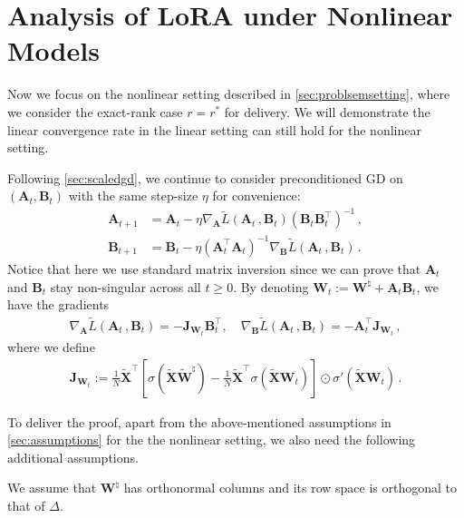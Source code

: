 \section{Analysis of LoRA under Nonlinear Models}
\label{sec:nonlinear}


Now we focus on the nonlinear setting described in \cref{sec:problsemsetting}, where we consider the exact-rank case $r=r^*$ for delivery.
We will demonstrate the linear convergence rate in the linear setting can still hold for the nonlinear setting.

Following \cref{sec:scaledgd}, we continue to consider preconditioned GD on $(\bm A_t, \bm B_t)$ with the same step-size $\eta$ for convenience:
\begin{equation}\label{eq:ABiter_nonlinear}
\begin{split}
     \bm A_{t+1} & = \bm A_t - \eta \nabla_{\bm A} \widetilde{L}\left(\bm A_t\,,\bm B_t\right)\left(\bm B_t \bm B_t^{\!\top}\right)^{-1}\,, \\
     \bm B_{t+1}  & = \bm B_t - \eta \left(\bm A_t^{\!\top} \bm A_t\right)^{-1} \nabla_{\bm B} \widetilde{L}\left(\bm A_t\,,\bm B_t\right)\,.
\end{split}
\end{equation}
Notice that here we use standard matrix inversion since we can prove that $\bm A_t$ and $\bm B_t$ stay non-singular across all $t\geq 0$.
By denoting $\bm W_t := \bm W^{\natural} + \bm A_t \bm B_t$, we have the gradients
\begin{align*}
\nabla_{\bm A}\widetilde{L}\left(\bm A_t\,,\bm B_t\right) = -\bm J_{
\bm W_t} \bm B_t^{\!\top}, \quad 
\nabla_{\bm B}\widetilde{L}\left(\bm A_t\,,\bm B_t\right) = -\bm A_t^{\!\top} \bm J_{
\bm W_t} \,,
\end{align*}
where we define 
\begin{align*}
    \bm J_{
\bm W_t} := \frac{1}{N}\widetilde{\bm X}^{\!\top}\left[\sigma(\widetilde{\bm X}\widetilde{\bm W}^\natural) - \frac{1}{N}\widetilde{\bm X}^{\!\top}\sigma(\widetilde{\bm X}\bm W_t)\right]\odot \sigma'(\widetilde{\bm X}\bm W_t)\,.
\end{align*}

To deliver the proof, apart from the above-mentioned assumptions in \cref{sec:assumptions} for the the nonlinear setting, we also need the following additional assumptions.
\begin{assumption}\label{assum:nonlinear-orth}
  We assume that $\bm W^\natural$ has orthonormal columns and its row space is orthogonal to that of $\Delta$.
\end{assumption}

